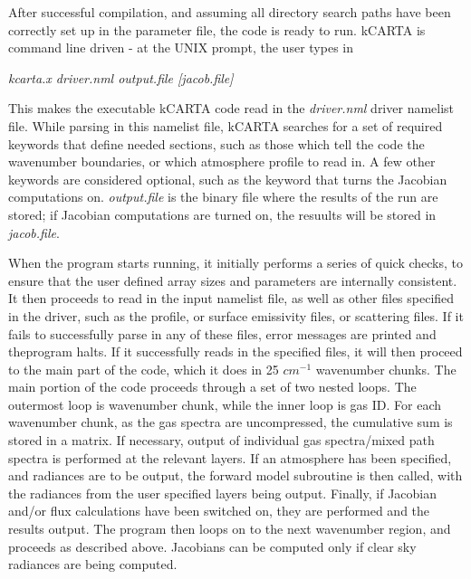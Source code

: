 \documentclass[11pt]{article}
\begin{document}
After successful compilation, and assuming all directory search paths have 
been correctly set up in the parameter file, the code is ready to run.  
\textsf{kCARTA} is command line driven - at the UNIX prompt, the user types in
\begin{center}
{\em kcarta.x driver.nml output.file [jacob.file]} 
\end{center}
This makes the executable \textsf{kCARTA} code read in the {\em driver.nml}
driver namelist file. While parsing in this namelist file, \textsf{kCARTA} 
searches for a set of 
required keywords that define needed sections, such as those which tell the 
code the wavenumber boundaries, or which atmosphere profile to read in. A few 
other keywords are considered optional, such as the keyword that turns the
Jacobian computations on.  {\em output.file} is the binary file where the
results of the run are stored; if Jacobian computations are turned on, the 
resuults will be stored in {\em jacob.file}.

When the program starts running, it initially performs a series of
quick checks, to ensure that the user defined array sizes and
parameters are internally consistent. It then proceeds to read in the
input namelist file, as well as other files specified in the driver, such as 
the profile, or surface emissivity files, or scattering files.  If it fails 
to successfully parse in any of these  files, error messages are printed and
theprogram halts. If it successfully reads in the specified 
files, it will then proceed to the main part of the code, which it does in
25 $cm^{-1}$ wavenumber chunks. The main portion of the code proceeds through 
a set of two nested loops. The outermost loop is wavenumber chunk, while the 
inner loop is gas ID. For each wavenumber chunk, as the gas spectra are 
uncompressed, the cumulative sum is stored in a matrix. If necessary, output 
of individual gas spectra/mixed path spectra is performed at the relevant
layers. If an atmosphere has been specified, and radiances are to be output, 
the forward model subroutine is then called, with the radiances from the 
user specified layers being output. Finally, if Jacobian and/or flux 
calculations have been switched on, they are performed and the results
output. The program then loops on to the next wavenumber region, and
proceeds as described above. Jacobians can be computed only if clear sky
radiances are being computed.
\end{document}
